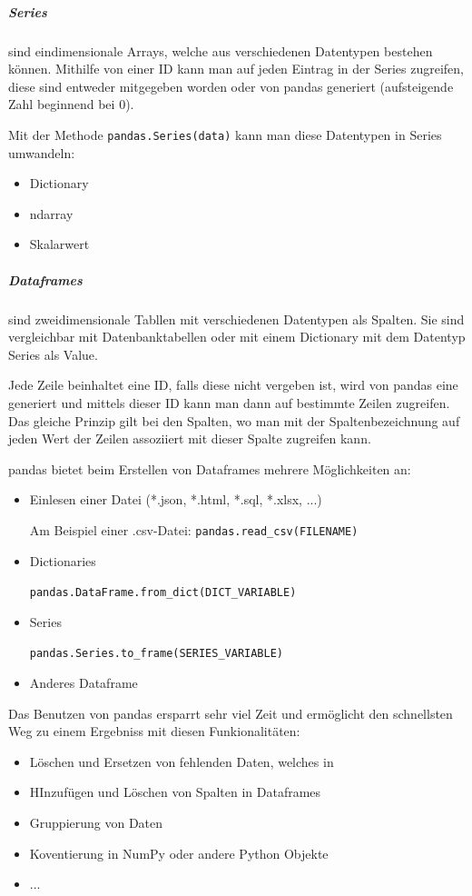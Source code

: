 \subparagraph*{Series} sind eindimensionale Arrays, welche aus verschiedenen Datentypen bestehen können. Mithilfe von einer ID kann man auf jeden Eintrag in der Series zugreifen, diese sind entweder mitgegeben worden oder von pandas generiert (aufsteigende Zahl beginnend bei 0).

Mit der Methode \lstinline!pandas.Series(data)! kann man diese Datentypen in Series umwandeln: 

\begin{itemize}
    \item Dictionary
    \item ndarray
    \item Skalarwert
\end{itemize}

\subparagraph{Dataframes} sind zweidimensionale Tabllen mit verschiedenen Datentypen als Spalten. Sie sind vergleichbar mit Datenbanktabellen oder mit einem Dictionary mit dem Datentyp Series als Value. 
    
Jede Zeile beinhaltet eine ID, falls diese nicht vergeben ist, wird von pandas eine generiert und mittels dieser ID kann man dann auf bestimmte Zeilen zugreifen. Das gleiche Prinzip gilt bei den Spalten, wo man mit der Spaltenbezeichnung auf jeden Wert der Zeilen assoziiert mit dieser Spalte zugreifen kann. 

pandas bietet beim Erstellen von Dataframes mehrere Möglichkeiten an:

\begin{itemize}
    \item Einlesen einer Datei (*.json, *.html, *.sql, *.xlsx, ...)
    
    Am Beispiel einer .csv-Datei: \lstinline!pandas.read_csv(FILENAME)!
    \item Dictionaries
    
    \lstinline!pandas.DataFrame.from_dict(DICT_VARIABLE)!
    \item Series
    
    \lstinline!pandas.Series.to_frame(SERIES_VARIABLE)!
    \item Anderes Dataframe
\end{itemize}

Das Benutzen von pandas ersparrt sehr viel Zeit und ermöglicht den schnellsten Weg zu einem Ergebniss mit diesen Funkionalitäten:

\begin{itemize}
    \item Löschen und Ersetzen von fehlenden Daten, welches in %
    \item HInzufügen und Löschen von Spalten in Dataframes
    \item Gruppierung von Daten
    \item Koventierung in NumPy oder andere Python Objekte
    \item ...
\end{itemize}

